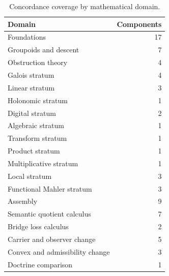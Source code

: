 \begin{table}[t]
\centering
\caption{Concordance coverage by mathematical domain.}
\label{tab:domain-summary}
\small
\begin{tabular}{@{}lr@{}}
\toprule
Domain & Components\\
\midrule
Foundations & 17\\
Groupoids and descent & 7\\
Obstruction theory & 4\\
Galois stratum & 4\\
Linear stratum & 3\\
Holonomic stratum & 1\\
Digital stratum & 2\\
Algebraic stratum & 1\\
Transform stratum & 1\\
Product stratum & 1\\
Multiplicative stratum & 1\\
Local stratum & 3\\
Functional Mahler stratum & 3\\
Assembly & 9\\
Semantic quotient calculus & 7\\
Bridge loss calculus & 2\\
Carrier and observer change & 5\\
Convex and admissibility change & 3\\
Doctrine comparison & 1\\
\bottomrule
\end{tabular}
\end{table}

